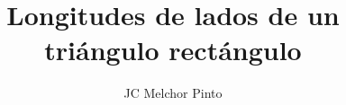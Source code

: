 \documentclass[12pt,addpoints]{guia}
\title{Longitudes de lados de un triángulo rectángulo}
\author{JC Melchor Pinto}
\begin{document}
\INFO%
\begin{multicols}{2}
    
    
    
\end{multicols}
\ejemplosboxed[]
\begin{questions}
    \questionboxed[10]{}
    \questionboxed[10]{}
    \questionboxed[10]{}
    \questionboxed[10]{}
    \questionboxed[10]{}
    \questionboxed[10]{}
    \questionboxed[10]{}
    \questionboxed[15]{}
    \questionboxed[15]{}
\end{questions}
\end{document}
